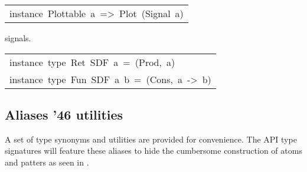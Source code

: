 \begin{haddockdesc}
\item[\begin{tabular}{@{}l}
instance\ Plottable\ a\ =>\ Plot\ (Signal\ a)
\end{tabular}]\haddockbegindoc
{} signals.\par


\item[\begin{tabular}{@{}l}
instance\ type\ Ret\ SDF\ a\ =\ (Prod,\ {\char 91}a{\char 93})\\instance\ type\ Fun\ SDF\ a\ b\ =\ (Cons,\ {\char 91}a{\char 93}\ ->\ b)
\end{tabular}]
\end{haddockdesc}
\subsection{Aliases {\char '46} utilities}
A set of type synonyms and utilities are provided for
 convenience. The API type signatures will feature these aliases
 to hide the cumbersome construction of atoms and patters as seen
 in .\par

